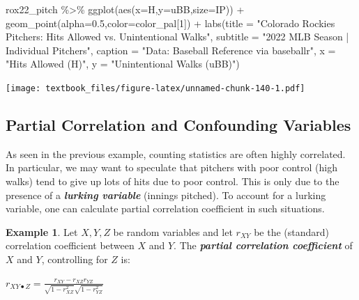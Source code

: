 \documentclass[
  11pt,
]{book}
\newenvironment{Shaded}{\begin{snugshade}}{\end{snugshade}}
\newcommand{\AttributeTok}[1]{\textcolor[rgb]{0.77,0.63,0.00}{#1}}
\newcommand{\DecValTok}[1]{\textcolor[rgb]{0.00,0.00,0.81}{#1}}
\newcommand{\FloatTok}[1]{\textcolor[rgb]{0.00,0.00,0.81}{#1}}
\newcommand{\FunctionTok}[1]{\textcolor[rgb]{0.00,0.00,0.00}{#1}}
\newcommand{\NormalTok}[1]{#1}
\newcommand{\SpecialCharTok}[1]{\textcolor[rgb]{0.00,0.00,0.00}{#1}}
\newcommand{\StringTok}[1]{\textcolor[rgb]{0.31,0.60,0.02}{#1}}
\theoremstyle{definition}
\theoremstyle{definition}
\newtheorem{example}{Example}[chapter]
\theoremstyle{definition}
\theoremstyle{definition}
\theoremstyle{remark}
\begin{document}
\begin{Shaded}
\begin{Highlighting}[]
\NormalTok{rox22\_pitch }\SpecialCharTok{\%\textgreater{}\%} 
  \FunctionTok{ggplot}\NormalTok{(}\FunctionTok{aes}\NormalTok{(}\AttributeTok{x=}\NormalTok{H,}\AttributeTok{y=}\NormalTok{uBB,}\AttributeTok{size=}\NormalTok{IP)) }\SpecialCharTok{+}
  \FunctionTok{geom\_point}\NormalTok{(}\AttributeTok{alpha=}\FloatTok{0.5}\NormalTok{,}\AttributeTok{color=}\NormalTok{color\_pal[}\DecValTok{1}\NormalTok{]) }\SpecialCharTok{+}
  \FunctionTok{labs}\NormalTok{(}\AttributeTok{title =} \StringTok{"Colorado Rockies Pitchers: Hits Allowed vs. Unintentional Walks"}\NormalTok{,}
       \AttributeTok{subtitle =} \StringTok{"2022 MLB Season | Individual Pitchers"}\NormalTok{,}
       \AttributeTok{caption =} \StringTok{"Data: Baseball Reference via baseballr"}\NormalTok{, }
       \AttributeTok{x =} \StringTok{"Hits Allowed (H)"}\NormalTok{,}
       \AttributeTok{y =} \StringTok{"Unintentional Walks (uBB)"}\NormalTok{)}
\end{Highlighting}
\end{Shaded}

\texttt{[image: textbook\_files/figure-latex/unnamed-chunk-140-1.pdf]}

\newpage

\hypertarget{partial-correlation-and-confounding-variables}{%
\subsection{Partial Correlation and Confounding Variables}\label{partial-correlation-and-confounding-variables}}

As seen in the previous example, counting statistics are often highly correlated. In particular, we may want to speculate that pitchers with poor control (high walks) tend to give up lots of hits due to poor control. This is only due to the presence of a \textbf{\emph{lurking variable}} (innings pitched). To account for a lurking variable, one can calculate partial correlation coefficient in such situations.

\begin{example}
Let \(X,Y,Z\) be random variables and let \(r_{XY}\) be the (standard) correlation coefficient between \(X\) and \(Y\). The \textbf{\emph{partial correlation coefficient}} of \(X\) and \(Y\), controlling for \(Z\) is:

\(r_{XY \bullet Z} = \frac{r_{XY}-r_{XZ}r_{YZ}}{\sqrt{1-r_{XZ}^2}\sqrt{1-r_{YZ}^2}}\)
\end{example}
\end{document}
